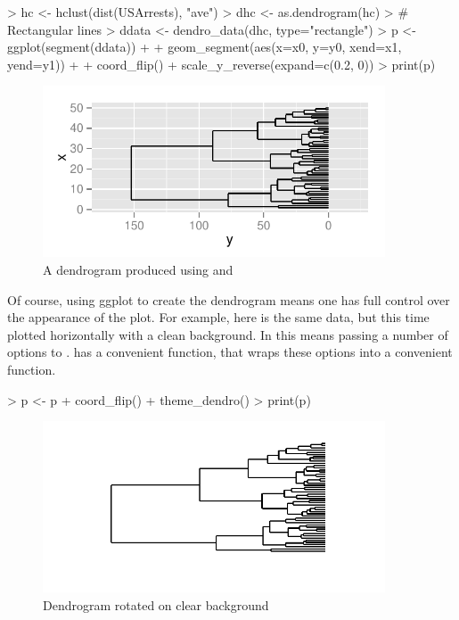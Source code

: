 \documentclass[10pt,oneside]{article}
\begin{document}
\begin{Schunk}
\begin{Sinput}
> hc <- hclust(dist(USArrests), "ave")
> dhc <- as.dendrogram(hc)
> # Rectangular lines
> ddata <- dendro_data(dhc, type="rectangle")
> p <- ggplot(segment(ddata)) + 
+     geom_segment(aes(x=x0, y=y0, xend=x1, yend=y1)) + 
+     coord_flip() + scale_y_reverse(expand=c(0.2, 0))
> print(p)
\end{Sinput}
\end{Schunk}

\begin{figure}[h]
\begin{center}
\includegraphics[width=4in, height=2in]{ggdendro-dendro1}
\end{center}
\caption{A dendrogram produced using \dendrodata{} and }
\end{figure}


Of course, using ggplot to create the dendrogram means one has full control over the appearance of the plot.  For example, here is the same data, but this time plotted horizontally with a clean background.  In  this means passing a number of options to .  \ggdendro{} has a convenient function,  that wraps these options into a convenient function.

\begin{Schunk}
\begin{Sinput}
> p <- p + coord_flip() + theme_dendro()
> print(p)
\end{Sinput}
\end{Schunk}

\begin{figure}[h]
\begin{center}
\includegraphics[width=4in, height=2in]{ggdendro-dendro2}
\end{center}
\caption{Dendrogram rotated on clear background}
\end{figure}
\end{document}
